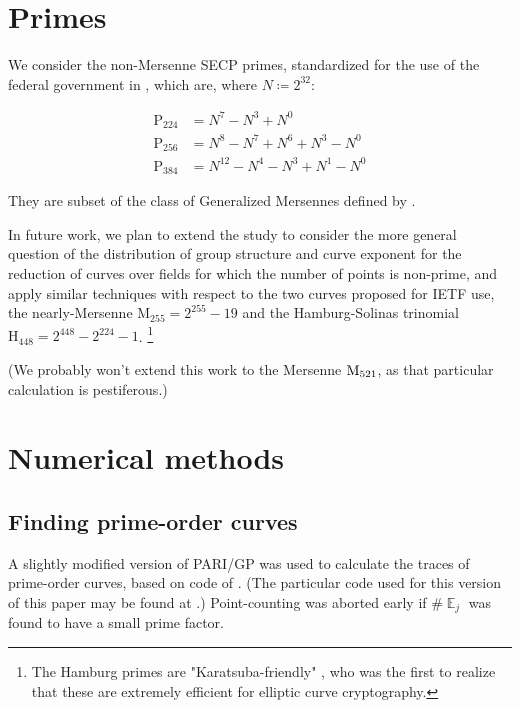 \documentclass[11pt,fleqn]{article}
\newcommand{\Pa}{\ensuremath{\mathup{P}_{224}} }
\newcommand{\Pb}{\ensuremath{\mathup{P}_{256}} }
\newcommand{\Pc}{\ensuremath{\mathup{P}_{384}} }
\newcommand{\Pd}{\ensuremath{\mathup{M}_{255}} }
\newcommand{\Pg}{\ensuremath{\mathup{H}_{448}} }
\newcommand{\Ej}{\ensuremath{\BbbE_j} }
\begin{document}
\section{Primes}

We consider the non-Mersenne SECP primes, standardized for the use of the
federal government in \cite{recur}, which are, where $N \coloneqq 2^{32}$:

\begin{equation}
\begin{aligned}
    \Pa &= N^7 - N^3 + N^0                \\
    \Pb &= N^8 - N^7 + N^6 + N^3 - N^0    \\
    \Pc &= N^{12} - N^4 - N^3 + N^1 - N^0
\end{aligned}
\end{equation}

They are subset of the class of Generalized Mersennes defined by
\autocite{solinas}.


In future work, we plan to extend the study to consider the more general question
of the distribution of group structure and curve exponent for the reduction of
curves over fields for which the number of points is non-prime, and apply similar
techniques with respect to the two curves proposed for IETF use, the nearly-Mersenne
$\Pd = 2^{255}-19$ and the Hamburg-Solinas trinomial $\Pg = 2^{448}-2^{224}-1$.
\footnote{The Hamburg primes are "Karatsuba-friendly" \cite{Hamburg}, who was the
first to realize that these are extremely efficient for elliptic curve cryptography.}

(We probably won't extend this work to the Mersenne $\textup{M}_{521}$, as that
particular calculation is pestiferous.)

\section{Numerical methods}

\subsection{Finding prime-order curves}

A slightly modified version of PARI/GP was used to calculate the
traces of prime-order curves, based on code of \cite{Hamburg}.
(The particular code used for this version of this paper may be
found at \autocite{junkpari}.) Point-counting was aborted early
if $\#\Ej$ was found to have a small prime factor.
\end{document}
